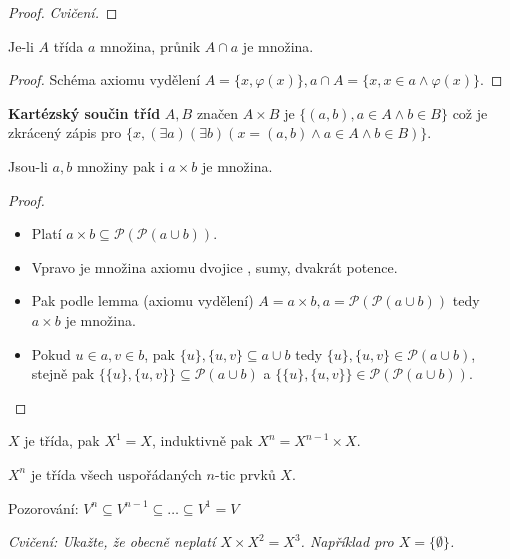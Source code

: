 \begin{proof}
	\textit{Cvičení.}
\end{proof}

\begin{lemma}
	Je-li $A$ třída $a$ množina, průnik $A \cap a$ je množina.
\end{lemma}

\begin{proof}
	Schéma axiomu vydělení $A = \{x, \varphi(x)\}, a \cap A = \{x, x \in a \land \varphi(x)\}$.
\end{proof}

\begin{definice}
	\textbf{Kartézský součin tříd} $A,B$ značen $A \times B$ je $\{(a,b), a \in A \land b \in B\}$ což je zkrácený zápis pro $\{x, (\exists a)(\exists b)(x = (a,b) \land a \in A \land b \in B)\}$.
\end{definice}

\begin{lemma}
	Jsou-li $a,b$ množiny pak i $a \times b$ je množina.
\end{lemma}

\begin{proof}
	\begin{itemize}
		\item Platí $a \times b \subseteq \mathcal{P}(\mathcal{P}( a \cup b))$.
		\item Vpravo je množina axiomu dvojice , sumy, dvakrát potence.
		\item Pak podle lemma (axiomu vydělení) $A = a \times b, a = \mathcal{P}(\mathcal{P}(a \cup b))$ tedy $a \times b$ je množina.
		\item Pokud $u \in a, v \in b$, pak $\{u\},\{u,v\} \subseteq a \cup b$ tedy $\{u\},\{u,v\} \in \mathcal{P}(a \cup b)$, stejně pak $\{\{u\}, \{u,v\}\} \subseteq \mathcal{P}(a \cup b)$ a $\{\{u\}, \{u,v\}\} \in \mathcal{P}(\mathcal{P}(a \cup b))$.
	\end{itemize}
\end{proof}

\begin{definice}
	$X$ je třída, pak $X^{1} = X$, induktivně pak $X^{n} = X^{n-1} \times X$.
\end{definice}

$X^{n}$ je třída všech uspořádaných $n$-tic prvků $X$.

Pozorování: $V^{n} \subseteq V^{n-1} \subseteq \dots \subseteq V^{1} = V$

\textit{Cvičení: Ukažte, že obecně neplatí $X \times X^{2} = X^{3}$. Například pro $X = \{\emptyset\}$.}
